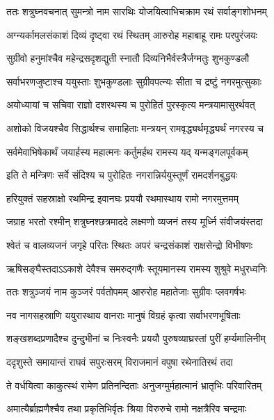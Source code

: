 \twolineshloka
{ततः शत्रुघ्नवचनात् सुमन्त्रो नाम सारथिः}
{योजयित्वाभिचक्राम रथं सर्वाङ्गशोभनम्} %

\twolineshloka
{अग्न्यर्कामलसंकाशं दिव्यं दृष्ट्वा रथं स्थितम्}
{आरुरोह महाबाहू रामः परपुरंजयः} %

\twolineshloka
{सुग्रीवो हनुमांश्चैव महेन्द्रसदृशद्युती}
{स्नातौ दिव्यनिभैर्वस्त्रैर्जग्मतुः शुभकुण्डलौ} %

\twolineshloka
{सर्वाभरणजुष्टाश्च ययुस्ताः शुभकुण्डलाः}
{सुग्रीवपत्न्यः सीता च द्रष्टुं नगरमुत्सुकाः} %

\twolineshloka
{अयोध्यायां च सचिवा राज्ञो दशरथस्य च}
{पुरोहितं पुरस्कृत्य मन्त्रयामासुरर्थवत्} %

\twolineshloka
{अशोको विजयश्चैव सिद्धार्थश्च समाहिताः}
{मन्त्रयन् रामवृद्ध्यर्थमृद्ध्यर्थं नगरस्य च} %

\twolineshloka
{सर्वमेवाभिषेकार्थं जयार्हस्य महात्मनः}
{कर्तुमर्हथ रामस्य यद् यन्मङ्गलपूर्वकम्} %

\twolineshloka
{इति ते मन्त्रिणः सर्वे संदिश्य च पुरोहितः}
{नगरान्निर्ययुस्तूर्णं रामदर्शनबुद्धयः} %

\twolineshloka
{हरियुक्तं सहस्राक्षो रथमिन्द्र इवानघः}
{प्रययौ रथमास्थाय रामो नगरमुत्तमम्} %

\twolineshloka
{जग्राह भरतो रश्मीन् शत्रुघ्नश्छत्रमाददे}
{लक्ष्मणो व्यजनं तस्य मूर्ध्नि संवीजयंस्तदा} %

\twolineshloka
{श्वेतं च वालव्यजनं जगृहे परितः स्थितः}
{अपरं चन्द्रसंकाशं राक्षसेन्द्रो विभीषणः} %

\twolineshloka
{ऋषिसङ्घैस्तदाऽऽकाशे देवैश्च समरुद्गणैः}
{स्तूयमानस्य रामस्य शुश्रुवे मधुरध्वनिः} %

\twolineshloka
{ततः शत्रुञ्जयं नाम कुञ्जरं पर्वतोपमम्}
{आरुरोह महातेजाः सुग्रीवः प्लवगर्षभः} %

\twolineshloka
{नव नागसहस्राणि ययुरास्थाय वानराः}
{मानुषं विग्रहं कृत्वा सर्वाभरणभूषिताः} %

\twolineshloka
{शङ्खशब्दप्रणादैश्च दुन्दुभीनां च निःस्वनैः}
{प्रययौ पुरुषव्याघ्रस्तां पुरीं हर्म्यमालिनीम्} %

\twolineshloka
{ददृशुस्ते समायान्तं राघवं सपुरःसरम्}
{विराजमानं वपुषा रथेनातिरथं तदा} %

\twolineshloka
{ते वर्धयित्वा काकुत्स्थं रामेण प्रतिनन्दिताः}
{अनुजग्मुर्महात्मानं भ्रातृभिः परिवारितम्} %

\twolineshloka
{अमात्यैर्ब्राह्मणैश्चैव तथा प्रकृतिभिर्वृतः}
{श्रिया विरुरुचे रामो नक्षत्रैरिव चन्द्रमाः} %

